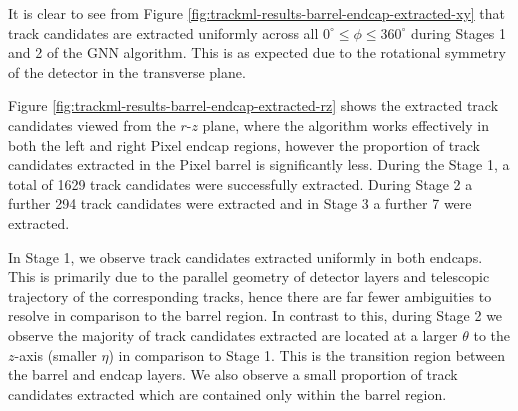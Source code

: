 It is clear to see from Figure \ref{fig:trackml-results-barrel-endcap-extracted-xy} that track candidates are extracted uniformly across all $ 0^{\circ} \leq \phi \leq 360^{\circ}$ during Stages 1 and 2 of the GNN algorithm. This is as expected due to the rotational symmetry of the detector in the transverse plane. 

Figure \ref{fig:trackml-results-barrel-endcap-extracted-rz} shows the extracted track candidates viewed from the $r$-$z$ plane, where the algorithm works effectively in both the left and right Pixel endcap regions, however the proportion of track candidates extracted in the Pixel barrel is significantly less. During the Stage 1, a total of 1629 track candidates were successfully extracted. During Stage 2 a further 294 track candidates were extracted and in Stage 3 a further 7 were extracted.

In Stage 1, we observe track candidates extracted uniformly in both endcaps. This is primarily due to the parallel geometry of detector layers and telescopic trajectory of the corresponding tracks, hence there are far fewer ambiguities to resolve in comparison to the barrel region. In contrast to this, during Stage 2 we observe the majority of track candidates extracted are located at a larger $\theta$ to the $z$-axis (smaller $\eta$) in comparison to Stage 1. This is the transition region between the barrel and endcap layers. We also observe a small proportion of track candidates extracted which are contained only within the barrel region.



